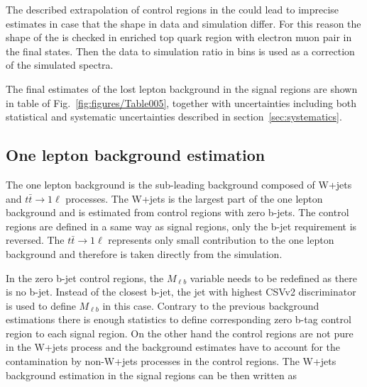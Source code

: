 The described extrapolation of control regions in the \MET could lead to imprecise estimates in case that the \MET shape in data and simulation differ. For this reason the shape of the \MET is checked in enriched top quark region with electron muon pair in the final states. Then the data to simulation ratio in \MET bins is used as a correction of the simulated \MET spectra. 

The final estimates of the lost lepton background in the signal regions are shown in table of Fig.~\ref{fig:figures/Table005}, together with uncertainties including both statistical and systematic uncertainties described in section~\ref{sec:systematics}.


\subsection{One lepton background estimation}


The  one lepton background is the sub-leading background composed of W+jets and $t\bar{t} \to 1\ell$ processes. The W+jets is the largest part of the one lepton background and is estimated from control regions with zero b-jets. The control regions are defined in a same way as signal regions, only the b-jet requirement is reversed. The  $t\bar{t} \to 1\ell$ represents only small contribution to the one lepton background and therefore is taken directly from the simulation.

In the zero b-jet control regions, the $M_{\ell b}$ variable needs to be redefined as there is no b-jet. Instead of the closest b-jet, the jet with highest CSVv2 discriminator is used to define $M_{\ell b}$ in this case. Contrary to the previous background estimations there is enough statistics to define corresponding zero b-tag control region to each signal region. On the other hand the control regions are not pure in the W+jets process and the background estimates have to account for the contamination by non-W+jets processes in the control regions. The W+jets background estimation in the signal regions can be then written as

